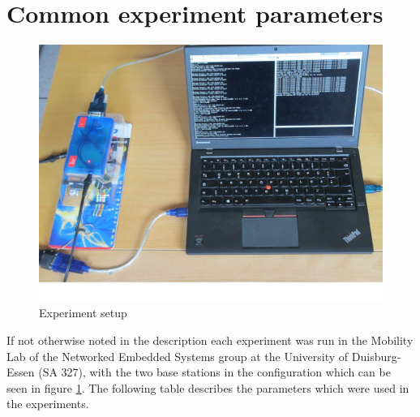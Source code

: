 \newpage

\section{Common experiment parameters}
\label{sec:commonPara}
\begin{figure}[H]
	\centering
	\includegraphics[scale=.5]{content/images/expSetup.JPG}
	\caption{Experiment setup}\label{fig:expSetup}
\end{figure}

If not otherwise noted in the description each experiment was run in the Mobility Lab of the Networked Embedded Systems group at the University of Duisburg-Essen (SA 327), with the two base stations in the configuration which can be seen in figure \ref{fig:expSetup}. The following table describes the parameters which were used in the experiments.

